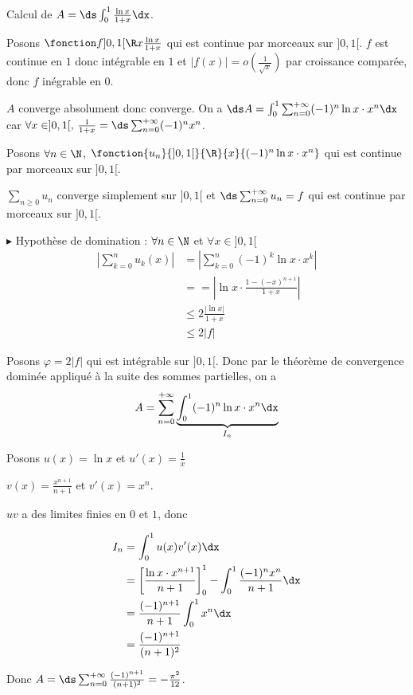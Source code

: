 \begin{exemple}
    Calcul de $A = \ds \int_0^1 \frac{\ln x}{1 + x} \dx$.

    Posons $\fonction f{]0, 1[}{\R}{x}{\frac{\ln x}{1 + x}}$ 
    qui est continue par morceaux sur $]0, 1[$. $f$ est continue en $1$ donc intégrable en $1$
    et $|f(x)| = o\left(\frac 1 {\sqrt x} \right)$ par croissance comparée, donc $f$ inégrable en $0$. 

    $A$ converge absolument donc converge. On a $\ds A = \int_{0}^{1 } \sum_{n = 0}^{+ \infty} (-1)^n \ln x \cdot x^n \dx$
    car $\forall x \in ]0, 1[, \, \frac 1 {1 + x} = \ds \sum_{n = 0}^{+ \infty} (-1)^n x^n$.

    Posons $\forall n \in \N$, $\fonction {u_n}{]0, 1[}{\R}{x}{(-1)^n \ln x \cdot x^n}$ qui est continue par morceaux sur $]0, 1[$.

    $\sum_{n \geqslant 0} u_n$ converge simplement sur $]0, 1[$ et $\ds \sum_{n = 0}^{+ \infty} u_n = f$ qui est continue par morceaux sur $]0, 1[$.

    \avspace $\blacktriangleright$ Hypothèse de domination : $\forall n \in \N$ et $\forall 
    x \in ]0, 1[$\begin{align}
        \left| \sum_{k = 0 }^{n } u_k(x) \right| & = \left| \sum_{k = 0}^{n } (-1)^k \ln x \cdot x^k \right| \\
        & == \left| \ln x \cdot \frac{1 - (-x)^{n + 1}}{1 + x} \right| \\
        & \leqslant 2 \frac{|\ln x|}{1+x} \\
        & \leqslant 2 |f|
    \end{align}

    Posons $\varphi = 2 |f|$ qui est intégrable sur $]0, 1[$. Donc par le théorème de convergence dominée 
    appliqué à la suite des sommes partielles, on a 
    $$A = \sum_{n=0}^{+ \infty} \underbrace{\int_{0}^{1} (-1)^n \ln x \cdot x^n \dx}_{I_n}$$

    Posons $u(x) = \ln x$ et $u'(x) = \frac 1 x$ 

    $v(x) = \frac{x^{n + 1}}{n + 1}$ et $v'(x) = x^n$.

    $uv$ a des limites finies en $0$ et $1$, donc 
    
    \begin{align}
    I_n & = \int_0^1 u(x) v'(x) \dx \\
    & = \left[ \frac{\ln x \cdot x^{n+1}}{n + 1} \right]_0^1 - \int_0^1 \frac{(-1)^nx^n}{n+1} \dx \\
    & = \frac{(-1)^{n+1}}{n + 1} \int_0^1 x^n \dx \\
    & = \frac{(-1)^{n+1}}{(n + 1)^2}
    \end{align}

    Donc $A = \ds \sum_{n = 0 }^{+ \infty} \frac{(-1)^{n+1}}{(n + 1)^2} = - \frac{\pi^2}{12}$.

\end{exemple}

